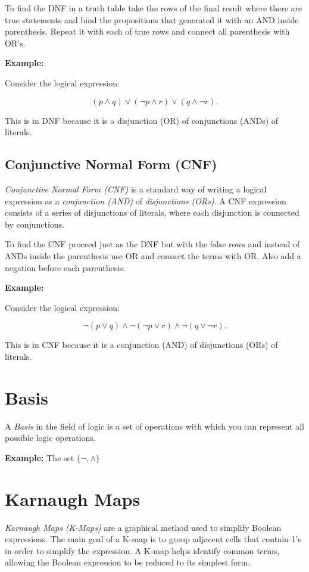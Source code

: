 To find the DNF in a truth table take the rows of the final result where there are
true statements and bind the propositions that generated it with an AND inside parenthesis.
Repeat it with each of true rows and connect all parenthesis with OR's.

\textbf{Example:}

Consider the logical expression:

\[
	(p \land q) \lor (\neg p \land r) \lor (q \land \neg r).
\]

This is in DNF because it is a disjunction (OR) of conjunctions (ANDs) of literals.

\subsection{Conjunctive Normal Form (CNF)}

\emph{Conjunctive Normal Form (CNF)} is a standard way of writing a logical expression as a
\emph{conjunction (AND)} of \emph{disjunctions (ORs)}. A CNF expression consists of a series of
disjunctions of literals, where each disjunction is connected by conjunctions.

To find the CNF proceed just as the DNF but with the false rows and instead
of ANDs inside the parenthesis use OR and connect the terms with OR\@.
Also add a negation before each parenthesis.

\textbf{Example:}

Consider the logical expression:

\[
	\neg (p \lor q) \land \neg (\neg p \lor r) \land \neg (q \lor \neg r).
\]

This is in CNF because it is a conjunction (AND) of disjunctions (ORs) of literals.

\section{Basis}

A \emph{Basis} in the field of logic is a set of operations with which you can
represent all possible logic operations.

\textbf{Example:} The set \(\{ \lnot, \land\}\)

\section{Karnaugh Maps}

\emph{Karnaugh Maps (K-Maps)} are a graphical method used to simplify Boolean expressions.
The main goal of a K-map is to group adjacent cells that contain 1's in order to simplify the expression.
A K-map helps identify common terms, allowing the Boolean expression to be reduced to its simplest form.

